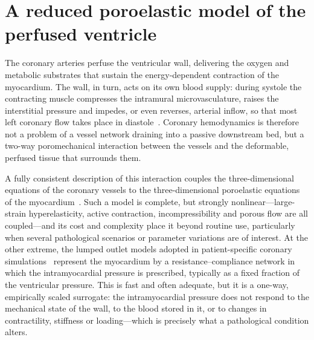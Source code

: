 \documentclass[11pt,a4paper]{article}
\begin{document}

\section{A reduced poroelastic model of the perfused ventricle}
\label{sec:0dporo}

The coronary arteries perfuse the ventricular wall, delivering the oxygen and metabolic substrates that sustain the energy-dependent contraction of the myocardium. The wall, in turn, acts on its own blood supply: during systole the contracting muscle compresses the intramural microvasculature, raises the interstitial pressure and impedes, or even reverses, arterial inflow, so that most left coronary flow takes place in diastole~\cite{Westerhof2006}. Coronary hemodynamics is therefore not a problem of a vessel network draining into a passive downstream bed, but a two-way poromechanical interaction between the vessels and the deformable, perfused tissue that surrounds them.

A fully consistent description of this interaction couples the three-dimensional equations of the coronary vessels to the three-dimensional poroelastic equations of the myocardium~\cite{Chapelle2010,DiGregorio2021}. Such a model is complete, but strongly nonlinear---large-strain hyperelasticity, active contraction, incompressibility and porous flow are all coupled---and its cost and complexity place it beyond routine use, particularly when several pathological scenarios or parameter variations are of interest. At the other extreme, the lumped outlet models adopted in patient-specific coronary simulations~\cite{Kim2010,Mynard2014} represent the myocardium by a resistance--compliance network in which the intramyocardial pressure is prescribed, typically as a fixed fraction of the ventricular pressure. This is fast and often adequate, but it is a one-way, empirically scaled surrogate: the intramyocardial pressure does not respond to the mechanical state of the wall, to the blood stored in it, or to changes in contractility, stiffness or loading---which is precisely what a pathological condition alters.
\end{document}
